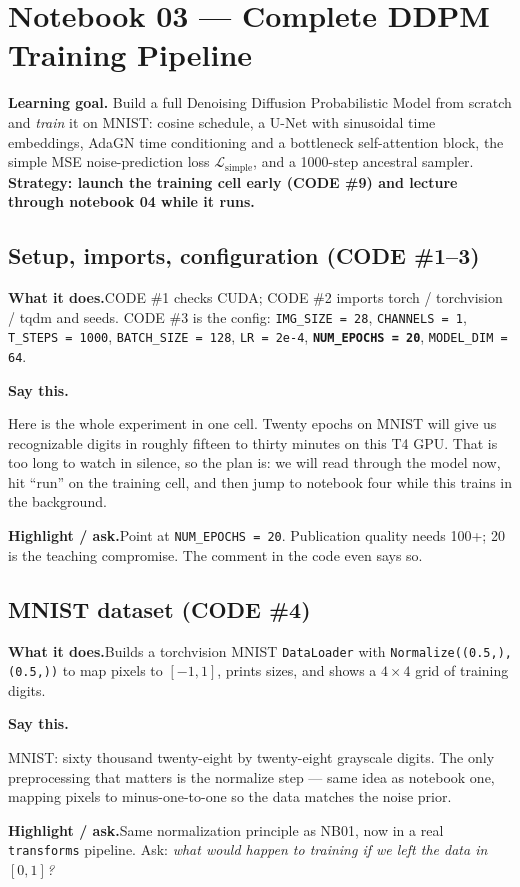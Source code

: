 \documentclass[11pt]{article}
\newenvironment{saythis}{%
  \par\smallskip\noindent
  \begin{list}{}{%
    \setlength{\leftmargin}{1.2em}%
    \setlength{\rightmargin}{0.5em}%
    \setlength{\topsep}{2pt}%
  }\item\relax
  \color{sayrule}\textbf{Say this.}\hspace{0.4em}\color{black}\itshape
}{%
  \end{list}\par\smallskip
}
\newcommand{\highlight}[1]{\par\smallskip\noindent\textcolor{hlcolor}{\textbf{Highlight / ask.}}\hspace{0.4em}#1\par\smallskip}
\newcommand{\whatdoes}[1]{\par\noindent\textbf{What it does.}\hspace{0.4em}#1\par}
\begin{document}
\section{Notebook 03 --- Complete DDPM Training Pipeline}

\textbf{Learning goal.} Build a full Denoising Diffusion Probabilistic Model from scratch and
\emph{train} it on MNIST: cosine schedule, a U-Net with sinusoidal time embeddings, AdaGN time
conditioning and a bottleneck self-attention block, the simple MSE noise-prediction loss
$\mathcal{L}_{\text{simple}}$, and a 1000-step ancestral sampler. \textbf{Strategy: launch the training
cell early (CODE \#9) and lecture through notebook 04 while it runs.}

\subsection{Setup, imports, configuration (CODE \#1--3)}
\whatdoes{CODE \#1 checks CUDA; CODE \#2 imports torch / torchvision / tqdm and seeds. CODE \#3 is the
config: \texttt{IMG\_SIZE = 28}, \texttt{CHANNELS = 1}, \texttt{T\_STEPS = 1000}, \texttt{BATCH\_SIZE = 128},
\texttt{LR = 2e-4}, \textbf{\texttt{NUM\_EPOCHS = 20}}, \texttt{MODEL\_DIM = 64}.}
\begin{saythis}
Here is the whole experiment in one cell. Twenty epochs on MNIST will give us recognizable digits in
roughly fifteen to thirty minutes on this T4 GPU. That is too long to watch in silence, so the plan is:
we will read through the model now, hit ``run'' on the training cell, and then jump to notebook four
while this trains in the background.
\end{saythis}
\highlight{Point at \texttt{NUM\_EPOCHS = 20}. Publication quality needs 100+; 20 is the teaching
compromise. The comment in the code even says so.}

\subsection{MNIST dataset (CODE \#4)}
\whatdoes{Builds a torchvision MNIST \texttt{DataLoader} with \texttt{Normalize((0.5,),(0.5,))} to map
pixels to $[-1,1]$, prints sizes, and shows a $4\times4$ grid of training digits.}
\begin{saythis}
MNIST: sixty thousand twenty-eight by twenty-eight grayscale digits. The only preprocessing that matters
is the normalize step --- same idea as notebook one, mapping pixels to minus-one-to-one so the data
matches the noise prior.
\end{saythis}
\highlight{Same normalization principle as NB01, now in a real \texttt{transforms} pipeline. Ask:
\emph{what would happen to training if we left the data in $[0,1]$?}}
\end{document}
